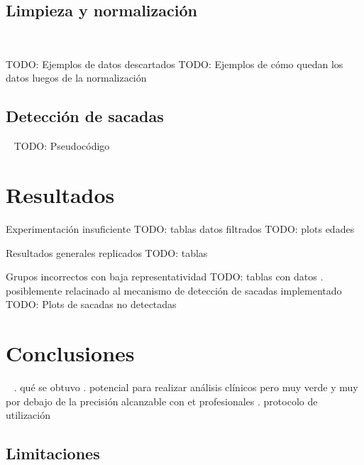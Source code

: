 \documentclass[aspectratio=169]{beamer}
\begin{document}
\subsection{Limpieza y normalización}

\begin{frame}{~}

TODO: Ejemplos de datos descartados
TODO: Ejemplos de cómo quedan los datos luegos de la normalización

\end{frame}

\subsection{Detección de sacadas}

\begin{frame}{~}
TODO: Pseudocódigo
\end{frame}

\section{Resultados}

\begin{frame}{Experimentación insuficiente}
TODO: tablas datos filtrados
TODO: plots edades
\end{frame}

\begin{frame}{Resultados generales replicados}
TODO: tablas
\end{frame}

\begin{frame}{Grupos incorrectos con baja representatividad}
TODO: tablas con datos
. posiblemente relacinado al mecanismo de detección de sacadas implementado
TODO: Plots de sacadas no detectadas
\end{frame}

\section{Conclusiones}

\begin{frame}{~}
. qué se obtuvo
. potencial para realizar análisis clínicos pero muy verde y muy por debajo de
  la precisión alcanzable con et profesionales
. protocolo de utilización
\end{frame}

\subsection{Limitaciones}
\end{document}
